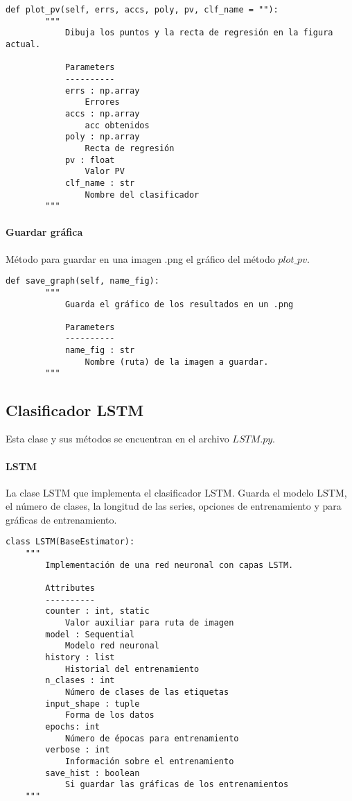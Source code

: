 \begin{lstlisting}
def plot_pv(self, errs, accs, poly, pv, clf_name = ""):
        """
            Dibuja los puntos y la recta de regresión en la figura actual.

            Parameters
            ----------
            errs : np.array
                Errores
            accs : np.array
                acc obtenidos
            poly : np.array
                Recta de regresión
            pv : float
                Valor PV
            clf_name : str
                Nombre del clasificador
        """
\end{lstlisting}

\paragraph{Guardar gráfica}

Método para guardar en una imagen .png el gráfico del método $plot\_pv$.

\begin{lstlisting}
def save_graph(self, name_fig):
        """
            Guarda el gráfico de los resultados en un .png

            Parameters
            ----------
            name_fig : str
                Nombre (ruta) de la imagen a guardar.
        """
\end{lstlisting}

\subsection{Clasificador LSTM}

Esta clase y sus métodos se encuentran en el archivo $LSTM.py$.

\paragraph{LSTM}

La clase LSTM que implementa el clasificador LSTM. Guarda el modelo LSTM, el número de clases, la longitud de las series, opciones de entrenamiento y para gráficas de entrenamiento.

\begin{lstlisting}
class LSTM(BaseEstimator):
    """
        Implementación de una red neuronal con capas LSTM.

        Attributes
        ----------
        counter : int, static
            Valor auxiliar para ruta de imagen
        model : Sequential
            Modelo red neuronal
        history : list
            Historial del entrenamiento
        n_clases : int
            Número de clases de las etiquetas
        input_shape : tuple
            Forma de los datos
        epochs: int
            Número de épocas para entrenamiento
        verbose : int
            Información sobre el entrenamiento
        save_hist : boolean
            Si guardar las gráficas de los entrenamientos
    """
\end{lstlisting}

